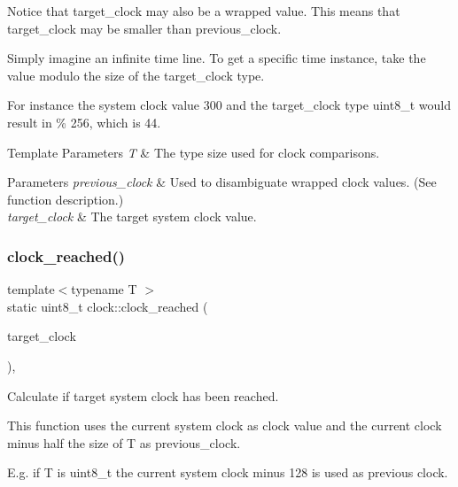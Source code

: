 Notice that target\+\_\+clock may also be a wrapped value. This means that target\+\_\+clock may be smaller than previous\+\_\+clock.

Simply imagine an infinite time line. To get a specific time instance, take the value modulo the size of the target\+\_\+clock type.

For instance the system clock value 300 and the target\+\_\+clock type uint8\+\_\+t would result in { \% 256}, which is 44.


\begin{DoxyTemplParams}{Template Parameters}
{\em T} & The type size used for clock comparisons. \\
\hline
\end{DoxyTemplParams}

\begin{DoxyParams}{Parameters}
{\em previous\+\_\+clock} & Used to disambiguate wrapped clock values. (See function description.) \\
\hline
{\em target\+\_\+clock} & The target system clock value. \\
\hline
\end{DoxyParams}
\hypertarget{namespaceclock_a240d81de9119f92701aa5f26555972c4}{}\label{namespaceclock_a240d81de9119f92701aa5f26555972c4} 
\subsubsection{\texorpdfstring{clock\+\_\+reached()}{clock\_reached()}\hspace{0.1cm}{\footnotesize\ttfamily [3/3]}}
{\footnotesize\ttfamily template$<$typename T $>$ \\
static uint8\+\_\+t clock\+::clock\+\_\+reached (\begin{DoxyParamCaption}\item[{const T \&}]{target\+\_\+clock }\end{DoxyParamCaption})\hspace{0.3cm}{\ttfamily [inline]}, {\ttfamily [static]}}



Calculate if target system clock has been reached. 

This function uses the current system clock as clock value and the current clock minus half the size of T as previous\+\_\+clock.

E.\+g. if T is uint8\+\_\+t the current system clock minus 128 is used as previous clock.

